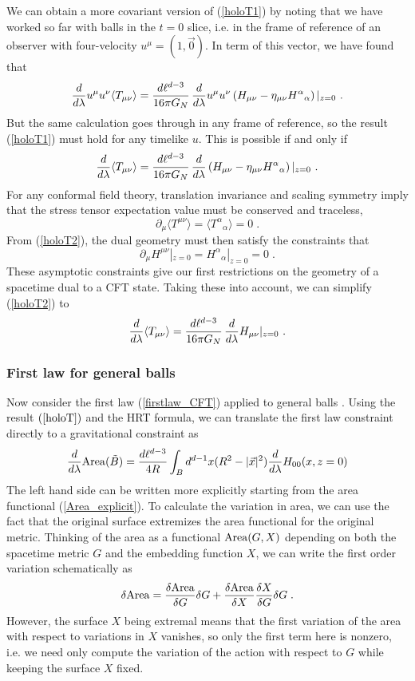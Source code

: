 \documentclass[12pt,epsf]{article}
\newcommand{\be}{\begin{equation}}
\newcommand{\ee}{\end{equation}}
\begin{document}
We can obtain a more covariant version of (\ref{holoT1}) by noting that we have worked so far with balls in the $t=0$ slice, i.e. in the frame of reference of an observer with four-velocity $u^\mu = (1,\vec{0})$. In term of this vector, we have found that
\be
\label{holoT2}
 {d \over d \lambda} u^\mu u^\nu \langle T_{\mu \nu} \rangle = \frac{d \ell^{d-3}}{16 \pi G_N}\,  {d \over d \lambda} u^\mu u^\nu \left(H_{\mu \nu} - \eta_{\mu \nu} H^\alpha {}_\alpha \right)|_{z=0}  \ .
\ee
But the same calculation goes through in any frame of reference, so the result (\ref{holoT1}) must hold for any timelike $u$. This is possible if and only if
\be
\label{holoT3}
 {d \over d \lambda} \langle T_{\mu \nu} \rangle = \frac{d \ell^{d-3}}{16 \pi G_N}\,  {d \over d \lambda} \left(H_{\mu \nu} - \eta_{\mu \nu} H^\alpha {}_\alpha \right)|_{z=0}  \ .
\ee
For any conformal field theory, translation invariance and scaling symmetry imply that the stress tensor expectation value must be conserved and traceless,
\be
\partial_\mu \langle T^{\mu \nu} \rangle = \langle T^{\alpha} {}_\alpha \rangle = 0 \; .
\ee
From (\ref{holoT2}), the dual geometry must then satisfy the constraints that
\be
\label{asymptconstr}
\partial_\mu H^{\mu \nu}|_{z=0} = H^\alpha {}_\alpha|_{z=0} = 0 \; .
\ee
These asymptotic constraints give our first restrictions on the geometry of a spacetime dual to a CFT state. Taking these into account, we can simplify (\ref{holoT2}) to
\be
\label{holoT}
 {d \over d \lambda} \langle T_{\mu \nu} \rangle = \frac{d \ell^{d-3}}{16 \pi G_N}\,  {d \over d \lambda} H_{\mu \nu} |_{z=0}  \ .
\ee

\subsubsection*{First law for general balls}

Now consider the first law (\ref{firstlaw_CFT}) applied to general balls \cite{Lashkari:2013koa,faulkner2014gravitation}. Using the result $(\ref{holoT})$ and the HRT formula, we can translate the first law constraint directly to a gravitational constraint as
\be
\label{firstlaw_grav1}
{d \over d \lambda} {\rm Area}(\tilde{B}) = {d \ell^{d-3} \over 4 R} \int_B d^{d-1} x (R^2 - |\vec{x}|^2) {d \over d \lambda} H_{00}(x,z=0)
\ee
The left hand side can be written more explicitly starting from the area functional (\ref{Area_explicit}). To calculate the variation in area, we can use the fact that the original surface extremizes the area functional for the original metric. Thinking of the area as a functional ${\rm Area}(G,X)$ depending on both the spacetime metric $G$ and the embedding function $X$, we can write the first order variation schematically as
\be
\delta {\rm Area} = {\delta {\rm Area} \over \delta G} \delta G + {\delta {\rm Area} \over \delta X} {\delta X \over \delta G} \delta G \; .
\ee
However, the surface $X$ being extremal means that the first variation of the area with respect to variations in $X$ vanishes, so only the first term here is nonzero, i.e. we need only compute the variation of the action with respect to $G$ while keeping the surface $X$ fixed.
\end{document}
